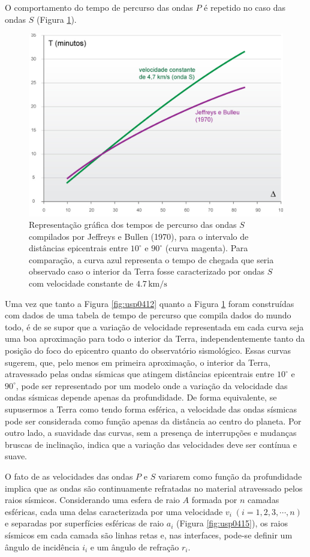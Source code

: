 \documentclass[]{book}
\theoremstyle{definition}
\theoremstyle{definition}
\theoremstyle{definition}
\theoremstyle{remark}
\begin{document}
O comportamento do tempo de percurso das ondas \(P\) é repetido no caso das ondas \(S\) (Figura \ref{fig:usp0414}).

\begin{figure}

{\centering \includegraphics[width=0.5\linewidth]{fig/figU14} 

}

\caption{Representação gráfica dos tempos de percurso das ondas $S$ compilados por Jeffreys e Bullen (1970), para o intervalo de distâncias epicentrais entre $10^\circ$ e $90^\circ$ (curva magenta). Para comparação, a curva azul representa o tempo de chegada que seria observado caso o interior da Terra fosse caracterizado por ondas $S$ com velocidade constante de $4.7\, \mathrm{km/s}$}\label{fig:usp0414}
\end{figure}

Uma vez que tanto a Figura \ref{fig:usp0412} quanto a Figura \ref{fig:usp0414} foram construídas com dados de uma tabela de tempo de percurso que compila dados do mundo todo, é de se supor que a variação de velocidade representada em cada curva seja uma boa aproximação para todo o interior da Terra, independentemente tanto da posição do foco do epicentro quanto do observatório sismológico. Essas curvas sugerem, que, pelo menos em primeira aproximação, o interior da Terra, atravessado pelas ondas sísmicas que atingem distâncias epicentrais entre \(10^\circ\) e \(90^\circ\), pode ser representado por um modelo onde a variação da velocidade das ondas sísmicas depende apenas da profundidade. De forma equivalente, se supusermos a Terra como tendo forma esférica, a velocidade das ondas sísmicas pode ser considerada como função apenas da distância ao centro do planeta. Por outro lado, a suavidade das curvas, sem a presença de interrupções e mudanças bruscas de inclinação, indica que a variação das velocidades deve ser contínua e suave.

O fato de as velocidades das ondas \(P\) e \(S\) variarem como função da profundidade implica que as ondas são continuamente refratadas no material atravessado pelos raios sísmicos. Considerando uma esfera de raio \(A\) formada por \(n\) camadas esféricas, cada uma delas caracterizada por uma velocidade \(v_i\; (i = 1,2,3,\cdots,n)\) e separadas por superfícies esféricas de raio \(a_i\) (Figura \ref{fig:usp0415}), os raios sísmicos em cada camada são linhas retas e, nas interfaces, pode-se definir um ângulo de incidência \(i_i\) e um ângulo de refração \(r_i\).
\end{document}
